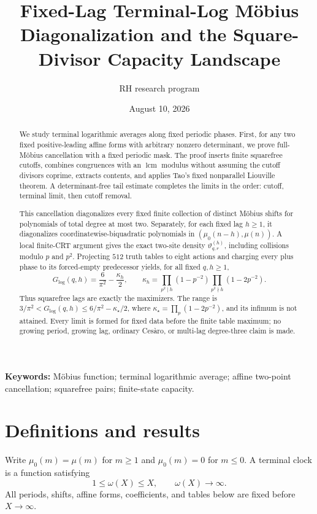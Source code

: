 \documentclass[11pt]{article}
\title{Fixed-Lag Terminal-Log M\"obius Diagonalization and the Square-Divisor Capacity Landscape}
\author{RH research program}
\date{August 10, 2026}
\theoremstyle{definition}
\theoremstyle{remark}
\newcommand{\mob}{\mu}
\newcommand{\thh}{\vartheta}
\newcommand{\kap}{\kappa}
\newcommand{\Glog}{G_{\log}}
\DeclareMathOperator{\lcm}{lcm}
\begin{document}
\maketitle

\begin{abstract}
We study terminal logarithmic averages along fixed periodic phases.  First,
for any two fixed positive-leading affine forms with arbitrary nonzero
determinant, we prove full-M\"obius cancellation with a fixed periodic mask.
The proof inserts finite squarefree cutoffs, combines congruences with an
\(\lcm\) modulus without assuming the cutoff divisors coprime, extracts
contents, and applies Tao's fixed nonparallel Liouville theorem.  A
determinant-free tail estimate completes the limits in the order: cutoff,
terminal limit, then cutoff removal.

This cancellation diagonalizes every fixed finite collection of distinct
M\"obius shifts for polynomials of total degree at most two.  Separately,
for each fixed lag \(h\ge1\), it diagonalizes coordinatewise-biquadratic
polynomials in \((\mob_0(n-h),\mob(n))\).  A local finite-CRT argument gives
the exact two-site density \(\thh^{(h)}_{q,r}\), including collisions modulo
\(p\) and \(p^2\).  Projecting \(512\) truth tables to eight actions and
charging every plus phase to its forced-empty predecessor yields, for all
fixed \(q,h\ge1\),
\[
 \Glog(q,h)=\frac6{\pi^2}-\frac{\kap_h}{2},\qquad
 \kap_h=\prod_{p^2\mid h}(1-p^{-2})
          \prod_{p^2\nmid h}(1-2p^{-2}).
\]
Thus squarefree lags are exactly the maximizers.  The range is
\(3/\pi^2<\Glog(q,h)\le6/\pi^2-\kap_\star/2\), where
\(\kap_\star=\prod_p(1-2p^{-2})\), and its infimum is not attained.  Every
limit is formed for fixed data before the finite table maximum; no growing
period, growing lag, ordinary Ces\`aro, or multi-lag degree-three claim is
made.
\end{abstract}

\noindent\textbf{Keywords:} M\"obius function; terminal logarithmic
average; affine two-point cancellation; squarefree pairs; finite-state
capacity.

\section{Definitions and results}

Write \(\mob_0(m)=\mob(m)\) for \(m\ge1\) and \(\mob_0(m)=0\) for
\(m\le0\).  A terminal clock is a function satisfying
\begin{equation}
 1\le \omega(X)\le X,\qquad \omega(X)\longrightarrow\infty.
 \label{eq:clock}
\end{equation}
All periods, shifts, affine forms, coefficients, and tables below are fixed
before \(X\to\infty\).
\end{document}
